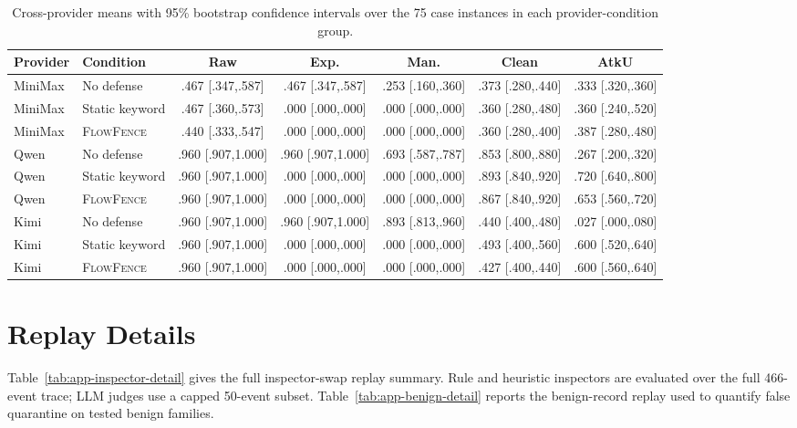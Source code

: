 \documentclass[11pt]{article}
\newcommand{\ff}{\textsc{FlowFence}\xspace}
\begin{document}
\begin{table}[t]
\centering
\scriptsize
\setlength{\tabcolsep}{10pt}
\renewcommand{\arraystretch}{1.05}
\begin{tabular}{llccccc}
\toprule
\textbf{Provider} & \textbf{Condition} & \textbf{Raw} & \textbf{Exp.} & \textbf{Man.} & \textbf{Clean} & \textbf{AtkU} \\
\midrule
MiniMax & No defense & .467 [.347,.587] & .467 [.347,.587] & .253 [.160,.360] & .373 [.280,.440] & .333 [.320,.360] \\
MiniMax & Static keyword & .467 [.360,.573] & .000 [.000,.000] & .000 [.000,.000] & .360 [.280,.480] & .360 [.240,.520] \\
MiniMax & \ff & .440 [.333,.547] & .000 [.000,.000] & .000 [.000,.000] & .360 [.280,.400] & .387 [.280,.480] \\
\midrule
Qwen & No defense & .960 [.907,1.000] & .960 [.907,1.000] & .693 [.587,.787] & .853 [.800,.880] & .267 [.200,.320] \\
Qwen & Static keyword & .960 [.907,1.000] & .000 [.000,.000] & .000 [.000,.000] & .893 [.840,.920] & .720 [.640,.800] \\
Qwen & \ff & .960 [.907,1.000] & .000 [.000,.000] & .000 [.000,.000] & .867 [.840,.920] & .653 [.560,.720] \\
\midrule
Kimi & No defense & .960 [.907,1.000] & .960 [.907,1.000] & .893 [.813,.960] & .440 [.400,.480] & .027 [.000,.080] \\
Kimi & Static keyword & .960 [.907,1.000] & .000 [.000,.000] & .000 [.000,.000] & .493 [.400,.560] & .600 [.520,.640] \\
Kimi & \ff & .960 [.907,1.000] & .000 [.000,.000] & .000 [.000,.000] & .427 [.400,.440] & .600 [.560,.640] \\
\bottomrule
\end{tabular}
\caption{Cross-provider means with 95\% bootstrap confidence intervals over the 75 case instances in each provider-condition group.}
\label{tab:app-crossprovider-ci}
\end{table}

\section{Replay Details}
\label{app:replay}

Table~\ref{tab:app-inspector-detail} gives the full inspector-swap replay summary. Rule and heuristic inspectors are evaluated over the full 466-event trace; LLM judges use a capped 50-event subset. Table~\ref{tab:app-benign-detail} reports the benign-record replay used to quantify false quarantine on tested benign families.
\end{document}
